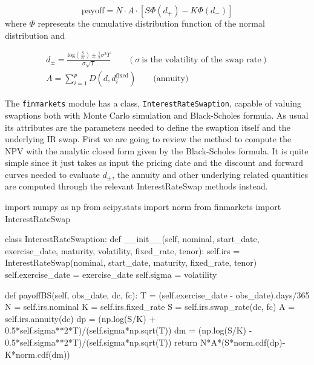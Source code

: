 \begin{equation}
\mathrm{payoff} = N\cdot A\cdot [S \Phi(d_+) - K\Phi(d_-)]
\end{equation}
where $\Phi$ represents the cumulative distribution function of the normal distribution and

\begin{equation}
\begin{gathered}
d_{\pm} = \frac{\mathrm{log}(\frac{S}{K}) \pm \frac{1}{2}\sigma^{2}T}{\sigma\sqrt{T}}\qquad(\sigma~\textrm{is the volatility of the swap rate})\\
A = \sum_{i=1}^{p}D(d, d_{i}^{\mathrm{fixed}})\qquad\mathrm{(annuity})
\end{gathered}
\end{equation}

\begin{finmarkets}
The \texttt{finmarkets} module has a class, \texttt{InterestRateSwaption}, capable of valuing swaptions both with Monte Carlo simulation and Black-Scholes formula. As usual its attributes are the parameters needed to define the swaption itself and the underlying IR swap. First we are going to review the method to compute the NPV with the analytic closed form given by the Black-Scholes formula. It is quite simple since it just takes as input the pricing date and the discount and forward curves needed to evaluate $d_{\pm}$, the annuity and other underlying related quantities are computed through the relevant InterestRateSwap methods instead.
\end{finmarkets}

\begin{ipython}
import numpy as np
from scipy.stats import norm 
from finmarkets import InterestRateSwap

class InterestRateSwaption:
    def __init__(self, nominal, start_date, exercise_date, maturity,
                 volatility, fixed_rate, tenor):
        self.irs = InterestRateSwap(nominal, start_date, maturity, fixed_rate, tenor)
        self.exercise_date = exercise_date
        self.sigma = volatility
        
    def payoffBS(self, obs_date, dc, fc):
        T = (self.exercise_date - obs_date).days/365
        N = self.irs.nominal
        K = self.irs.fixed_rate
        S = self.irs.swap_rate(dc, fc)
        A = self.irs.annuity(dc)
        dp = (np.log(S/K) + 0.5*self.sigma**2*T)/(self.sigma*np.sqrt(T))
        dm = (np.log(S/K) - 0.5*self.sigma**2*T)/(self.sigma*np.sqrt(T))
        return N*A*(S*norm.cdf(dp)-K*norm.cdf(dm))
\end{ipython}

